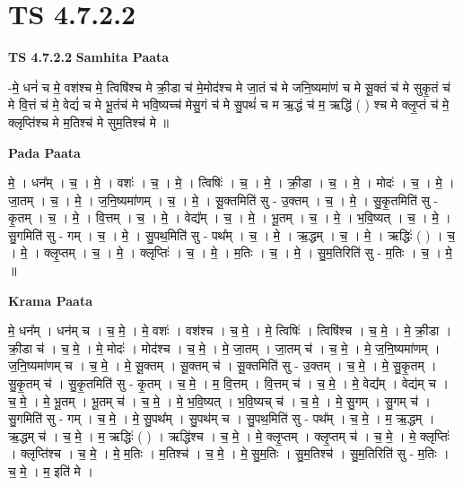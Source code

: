 \documentclass[17pt]{extarticle}
\begin{document}
\section{ TS 4.7.2.2 }

\textbf{TS 4.7.2.2 } \newline
\textbf{Samhita Paata} \newline

-मे॒ धनं॑ च मे॒ वश॑श्च मे॒ त्विषि॑श्च मे क्री॒डा च॑ मे॒मोद॑श्च मे जा॒तं च॑ मे जनि॒ष्यमा॑णं च मे सू॒क्तं च॑ मे सुकृ॒तं च॑ मे वि॒त्तं च॑ मे॒ वेद्यं॑ च मे भू॒तंच॑ मे भवि॒ष्यच्च॑ मेसु॒गं च॑ मे सु॒पथं॑ च म ऋ॒द्धं च॑ म॒ ऋद्धि॑ ( ) श्च मे क्लृ॒प्तं च॑ मे॒    क्लृप्ति॑श्च मे म॒तिश्च॑ मे सुम॒तिश्च॑ मे ॥ \newline

\textbf{Pada Paata} \newline

मे॒ । धन᳚म् । च॒ । मे॒ । वशः॑ । च॒ । मे॒ । त्विषिः॑ । च॒ । मे॒ । क्री॒डा । च॒ । मे॒ । मोदः॑ । च॒ । मे॒ । जा॒तम् । च॒ । मे॒ । ज॒नि॒ष्यमा॑णम् । च॒ । मे॒ । सू॒क्तमिति॑ सु - उ॒क्तम् । च॒ । मे॒ । सु॒कृ॒तमिति॑ सु - कृ॒तम् । च॒ । मे॒ । वि॒त्तम् । च॒ । मे॒ । वेद्य᳚म् । च॒ । मे॒ । भू॒तम् । च॒ । मे॒ । भ॒वि॒ष्यत् । च॒ । मे॒ । सु॒गमिति॑ सु - गम् । च॒ । मे॒ । सु॒पथ॒मिति॑ सु - पथ᳚म् । च॒ । मे॒ । ऋ॒द्धम् । च॒ । मे॒ । ऋद्धिः॑ ( ) । च॒ । मे॒ । क्लृ॒प्तम् । च॒ । मे॒ । क्लृप्तिः॑ । च॒ । मे॒ । म॒तिः । च॒ । मे॒ । सु॒म॒तिरिति॑ सु - म॒तिः । च॒ । मे॒ ॥  \newline


\textbf{Krama Paata} \newline

मे॒ धन᳚म् । धन॑म् च । च॒ मे॒ । मे॒ वशः॑ । वश॑श्च । च॒ मे॒ । मे॒ त्विषिः॑ । त्विषि॑श्च । च॒ मे॒ । मे॒ क्री॒डा । क्री॒डा च॑ । च॒ मे॒ । मे॒ मोदः॑ । मोद॑श्च । च॒ मे॒ । मे॒ जा॒तम् । जा॒तम् च॑ । च॒ मे॒ । मे॒ ज॒नि॒ष्यमा॑णम् । ज॒नि॒ष्यमा॑णम् च । च॒ मे॒ । मे॒ सू॒क्तम् । सू॒क्तम् च॑ । सू॒क्तमिति॑ सु - उ॒क्तम् । च॒ मे॒ । मे॒ सु॒कृ॒तम् । सु॒कृ॒तम् च॑ । सु॒कृ॒तमिति॑ सु - कृ॒तम् । च॒ मे॒ । म॒ वि॒त्तम् । वि॒त्तम् च॑ । च॒ मे॒ । मे॒ वेद्य᳚म् । वेद्य॑म् च । च॒ मे॒ । मे॒ भू॒तम् । भू॒तम् च॑ । च॒ मे॒ । मे॒ भ॒वि॒ष्यत् । भ॒वि॒ष्यच् च॑ । च॒ मे॒ । मे॒ सु॒गम् । सु॒गम् च॑ । सु॒गमिति॑ सु - गम् । च॒ मे॒ । मे॒ सु॒पथ᳚म् । सु॒पथ॑म् च । सु॒पथ॒मिति॑ सु - पथ᳚म् । च॒ मे॒ । म॒ ऋ॒द्धम् । ऋ॒द्धम् च॑ । च॒ मे॒ । म॒ ऋद्धिः॑ ( ) । ऋद्धि॑श्च । च॒ मे॒ । मे॒ क्लृ॒प्तम् । क्लृ॒प्तम् च॑ । च॒ मे॒ । मे॒ क्लृप्तिः॑ । क्लृप्ति॑श्च । च॒ मे॒ । मे॒ म॒तिः । म॒तिश्च॑ । च॒ मे॒ । मे॒ सु॒म॒तिः । सु॒म॒तिश्च॑ । सु॒म॒तिरिति॑ सु - म॒तिः । च॒ मे॒ । म॒ इति॑ मे । \newline
\end{document}
